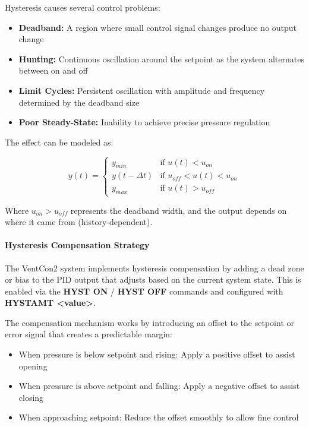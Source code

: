 \documentclass[12pt,a4paper]{article}
\begin{document}
Hysteresis causes several control problems:

\begin{itemize}
    \item \textbf{Deadband:} A region where small control signal changes produce no output change
    \item \textbf{Hunting:} Continuous oscillation around the setpoint as the system alternates between on and off
    \item \textbf{Limit Cycles:} Persistent oscillation with amplitude and frequency determined by the deadband size
    \item \textbf{Poor Steady-State:} Inability to achieve precise pressure regulation
\end{itemize}

The effect can be modeled as:

\begin{equation}
y(t) = \begin{cases}
y_{min} & \text{if } u(t) < u_{on} \\
y(t-\Delta t) & \text{if } u_{off} < u(t) < u_{on} \\
y_{max} & \text{if } u(t) > u_{off}
\end{cases}
\end{equation}

Where $u_{on} > u_{off}$ represents the deadband width, and the output depends on where it came from (history-dependent).

\paragraph{Hysteresis Compensation Strategy}
The VentCon2 system implements hysteresis compensation by adding a dead zone or bias to the PID output that adjusts based on the current system state. This is enabled via the \textbf{HYST ON} / \textbf{HYST OFF} commands and configured with \textbf{HYSTAMT <value>}.

The compensation mechanism works by introducing an offset to the setpoint or error signal that creates a predictable margin:

\begin{itemize}
    \item When pressure is below setpoint and rising: Apply a positive offset to assist opening
    \item When pressure is above setpoint and falling: Apply a negative offset to assist closing
    \item When approaching setpoint: Reduce the offset smoothly to allow fine control
\end{itemize}
\end{document}
